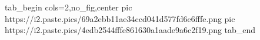  
 
 
 
 
\zzSecCmtScr

\ifcmt
  tab_begin cols=2,no_fig,center
     pic https://i2.paste.pics/69a2ebb11ae34ccd041d577fd6e6fffe.png
     pic https://i2.paste.pics/4edb2544fffe861630a1aade9a6c2f19.png
  tab_end
\fi
